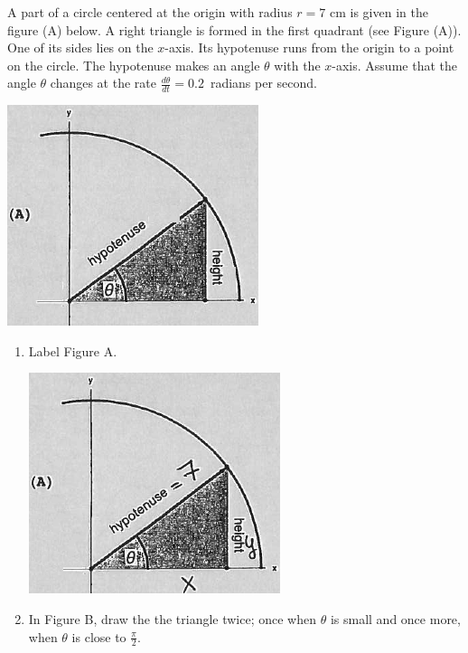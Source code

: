 \documentclass[nooutcomes]{ximera}
\begin{document}
\begin{problem}
A part of a circle centered at the origin with radius $r=7$ cm is given in the figure (A) below.  A right triangle is formed in the first quadrant (see Figure (A)).  One of its sides lies on the $x$-axis.  Its hypotenuse runs from the origin to a point on the circle.  The hypotenuse makes an angle $\theta$ with the $x$-axis.  Assume that the angle $\theta$ changes at the rate $\frac{d\theta}{dt}=0.2$\ radians per second.
	\begin{image}
	\includegraphics[scale=.5]{Figure10.png}
	\end{image}
	
\begin{enumerate}
	\item Label Figure A.
		\begin{freeResponse} \hfil
		\begin{image}
	\includegraphics[scale=.5]{Figure11.png}
	\end{image}
		\end{freeResponse}
	\item In Figure B, draw the the triangle twice; once when $\theta$ is small and once more, when $\theta$ is close to $\frac{\pi}{2}$.


\end{enumerate}
\end{problem}
\end{document}
